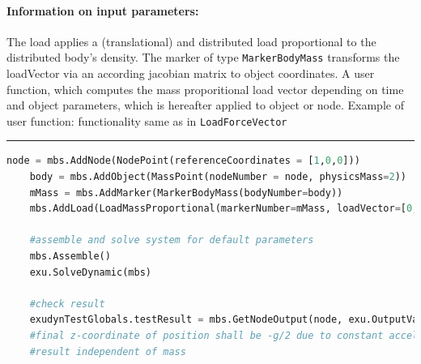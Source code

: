 \paragraph{Information on input parameters:} 
\finishTable
 \noindent
    The load applies a (translational) and distributed load proportional to the distributed body's density.
    The marker of type \texttt{MarkerBodyMass} transforms the loadVector via an according jacobian matrix to object coordinates.
    A user function, which computes the mass proporitional load vector depending on time and object parameters, which is hereafter applied to object or node.
    \finishTable
    Example of user function: functionality same as in \texttt{LoadForceVector}
\vspace{6pt}\par\noindent\rule{\textwidth}{0.4pt}
\label{miniExample_LoadMassProportional}
\pythonstyle
\begin{lstlisting}[language=Python, firstnumber=1]
    node = mbs.AddNode(NodePoint(referenceCoordinates = [1,0,0]))
    body = mbs.AddObject(MassPoint(nodeNumber = node, physicsMass=2))
    mMass = mbs.AddMarker(MarkerBodyMass(bodyNumber=body))
    mbs.AddLoad(LoadMassProportional(markerNumber=mMass, loadVector=[0,0,-9.81]))

    #assemble and solve system for default parameters
    mbs.Assemble()
    exu.SolveDynamic(mbs)

    #check result
    exudynTestGlobals.testResult = mbs.GetNodeOutput(node, exu.OutputVariableType.Position)[2]
    #final z-coordinate of position shall be -g/2 due to constant acceleration with g=-9.81
    #result independent of mass

\end{lstlisting}

